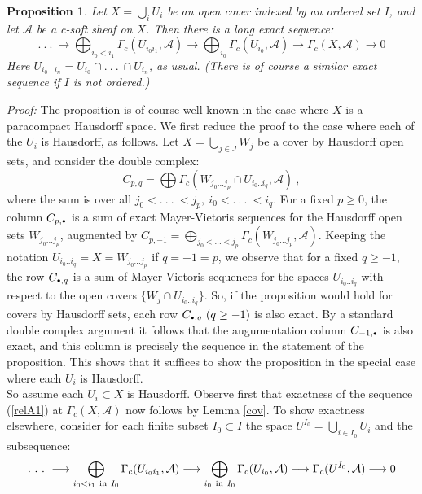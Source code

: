 \documentclass[a4paper]{article}
\newtheorem{prop}[st]{Proposition}
\newcommand{\rmap}{\longrightarrow}
\newcommand{\A}{\ensuremath{\mathcal{A}}}
\newcommand{\gc}{\ensuremath{\Gamma_c}}
\def\cdot{{\raise 0.5pt\hbox{$\scriptscriptstyle\bullet$}}}
\begin{document}
\begin{prop}
\label{MV}
Let $X= \bigcup_{i}U_{i}$ be an open cover indexed by an ordered set $I$, and let $\A$ be a c-soft sheaf on $X$. Then there is a long exact sequence:
\begin{equation}
\label{relA1}
 .\ .\ .\ \rmap \bigoplus_{i_{0}< i_{1}} \gc(U_{i_{0}i_{1}}, \A) \rmap \bigoplus_{i_{0}}\gc(U_{i_{0}}, \A) \rmap \gc(X, \A) \rmap 0
\end{equation}
Here $U_{i_{0}. . . i_{n}}= U_{i_{0}}\cap .\ .\ .\ \cap U_{i_{n}}$, as usual. (There is of course a similar exact sequence if $I$ is not ordered.)
\end{prop}
\emph{Proof:} The proposition is of course well known in the case where $X$ is a paracompact Hausdorff space. We first reduce the proof to the case where each of the $U_{i}$ is Hausdorff, as follows. Let $X= \bigcup_{j\in J}W_{j}$ be a cover by Hausdorff open sets, and consider the double complex:
\[ C_{p,q}= \bigoplus \gc(W_{j_{0} . . . j_{p}}\cap U_{i_{0} . .  i_{q}}, \A)\ ,\]
where the sum is over all $j_{0}< .\ .\ .\ < j_{p},\ i_{0}< .\ .\ .\ < i_{q}$. For a fixed $p \geq 0$, the column $C_{p, \cdot}$ is a sum of exact Mayer-Vietoris sequences for the Hausdorff open sets $W_{j_{0} . . . j_{p}}$, augmented by $C_{p,-1}= \bigoplus_{j_{0}< . . . < j_{p}}\gc(W_{j_{0} . . . j_{p}}, \A)$. Keeping the notation $U_{i_{0} . .  i_{q}}= X= W_{j_{0} . . . j_{p}}$ if $q= -1= p$, we observe that for a fixed $q\geq -1$, the row $C_{\cdot, q}$ is a sum of Mayer-Vietoris sequences for the spaces $U_{i_{0} . .  i_{q}}$ with respect to the open covers $\{ W_{j}\cap U_{i_{0} . .  i_{q}}\}$. So, if the proposition would hold for covers by Hausdorff sets, each row $C_{\cdot, q}\ (q\geq -1)$ is also exact. By a standard double complex argument it follows that the augumentation column $C_{-1, \cdot}$ is also exact, and this column is precisely the sequence in the statement of the proposition. This shows that it suffices to show the proposition in the special case where each $U_{i}$ is Hausdorff.\\
\hspace*{.3in} So assume each $U_{i}\subset X$ is Hausdorff. Observe first that exactness of the sequence (\ref{relA1}) at $\gc(X, \A)$ now follows by Lemma \ref{cov}. To show exactness elsewhere, consider for each finite subset $I_{0}\subset I$ the space $U^{I_{0}}= \bigcup_{i\in I_{0}} U_{i}$ and the subsequence:
\begin{equation}
\label{relA2}
 .\ .\ .\ \rmap \bigoplus_{i_{0}< i_{1} \ {\rm in} \ I_{0}} \gc(U_{i_{0}i_{1}}, \A) \rmap \bigoplus_{i_{0} \ {\rm in}\ I_{0}}\gc(U_{i_{0}}, \A) \rmap \gc(U^{I_{0}}, \A) \rmap 0
\end{equation}
\end{document}
